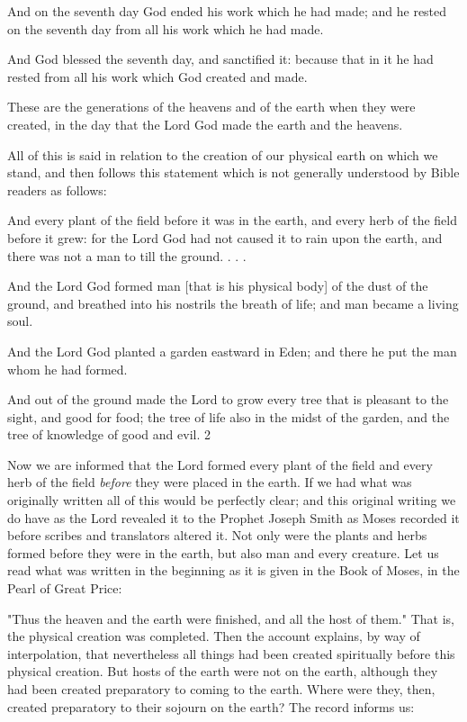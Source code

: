 And on the seventh day God ended his work which he had made; and he rested on the
seventh day from all his work which he had made.

And God blessed the seventh day, and sanctified it: because that in it he had rested from all
his work which God created and made.

These are the generations of the heavens and of the earth when they were created, in the day
that the Lord God made the earth and the heavens.

All of this is said in relation to the creation of our physical earth on which we stand, and then
follows this statement which is not generally understood by Bible readers as follows:

And every plant of the field before it was in the earth, and every herb of the field before it
grew: for the Lord God had not caused it to rain upon the earth, and there was not a man to
till the ground. . . .

And the Lord God formed man [that is his physical body] of the dust of the ground, and
breathed into his nostrils the breath of life; and man became a living soul.

And the Lord God planted a garden eastward in Eden; and there he put the man whom he had
formed.

And out of the ground made the Lord to grow every tree that is pleasant to the sight, and
good for food; the tree of life also in the midst of the garden, and the tree of knowledge of
good and evil. 2

Now we are informed that the Lord formed every plant of the field and every herb of the field
\textit{before} they were placed in the earth. If we had what was originally written all of this would
be perfectly clear; and this original writing we do have as the Lord revealed it to the Prophet
Joseph Smith as Moses recorded it before scribes and translators altered it. Not only were the
plants and herbs formed before they were in the earth, but also man and every creature. Let
us read what was written in the beginning as it is given in the Book of Moses, in the Pearl of
Great Price:

"Thus the heaven and the earth were finished, and all the host of them." That is, the physical
creation was completed. Then the account explains, by way of interpolation, that nevertheless
all things had been created spiritually before this physical creation. But hosts of the earth
were not on the earth, although they had been created preparatory to coming to the earth.
Where were they, then, created preparatory to their sojourn on the earth? The record informs
us:

